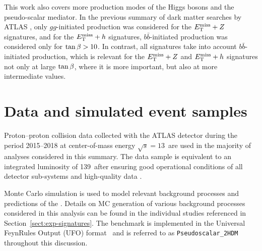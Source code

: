 This work also covers more production modes of the Higgs bosons and the pseudo-scalar mediator. 
In the previous summary of dark matter searches by ATLAS \cite{EXOT-2017-32}, 
only $gg$-initiated production was considered for the $E_{\mathrm{T}}^{\mathrm{miss}}+Z$ signatures, 
and for the $E_{\mathrm{T}}^{\mathrm{miss}}+h$ signatures, $b\bar{b}$-initiated production was considered only for $\tan\beta>10$. 
In contrast, all \met signatures take into account $b\bar{b}$-initiated production, 
which is relevant for the $E_{\mathrm{T}}^{\mathrm{miss}}+Z$ and $E_{\mathrm{T}}^{\mathrm{miss}}+h$ signatures not only at large $\tan\beta$, where it is more important, 
but also at more intermediate values\cite{2hdma_comb}.

\section{Data and simulated event samples}

Proton--proton collision data collected with the ATLAS detector during the period 2015--2018 
at center-of-mass energy $\sqrt{s}=13$~\TeV are used in the majority of analyses considered in this summary. 
The data sample is equivalent to an integrated luminosity of 139~\ifb after ensuring good operational 
conditions of all detector sub-systems and high-quality data \cite{DAPR-2018-01}.

Monte Carlo simulation is used to model relevant background processes and predictions of the \hdma. 
Details on MC generation of various background processes considered in this analysis can be found in the 
individual studies referenced in Section~\ref{sect:exp-signatures}. 
The \thdma benchmark is implemented in the Universal FeynRules Output (UFO) format~\cite{Degrande:2011ua} and 
is referred to as \texttt{Pseudoscalar\_2HDM} throughout this discussion.

